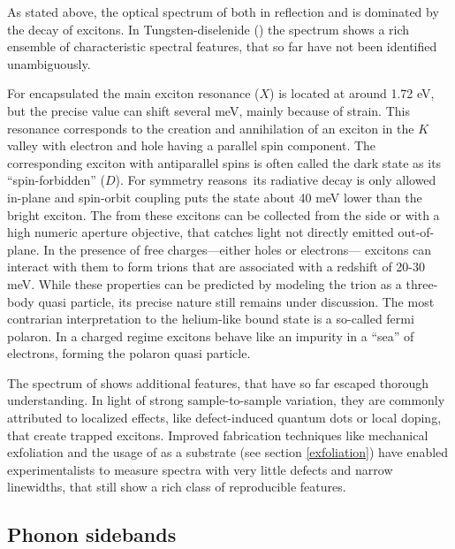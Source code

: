 As stated above, the optical spectrum of \tmds both in reflection and \pl is dominated by the decay of excitons. In Tungsten-diselenide (\wse\!) the \pl spectrum shows a rich ensemble of characteristic spectral features, that so far have not been identified unambiguously. 

For \hbng encapsulated \wse the main exciton resonance ($X$) is located at around 1.72 eV, but the precise value can shift several meV, mainly because of strain\cite{zhu_strain_2013}. This resonance corresponds to the creation and annihilation of an exciton in the $K$ valley with electron and hole having a parallel spin component. The corresponding exciton with antiparallel spins is often called the dark state as its ``spin-forbidden'' ($D$). For symmetry reasons\textregistered\ its radiative decay is only allowed in-plane and spin-orbit coupling puts the state about 40 meV lower than the bright exciton\cite{echeverry_splitting_2016}. The \pl from these excitons can be collected from the side or with a high numeric aperture objective, that catches light not directly emitted out-of-plane\cite{robert_fine_2017, wang_-plane_2017}. In the presence of free charges---either holes or electrons--- excitons can interact with them to form trions that are associated with a redshift of 20-30 meV\cite{courtade_charged_2017}. While these properties can be predicted by modeling the trion as a three-body quasi particle, its precise nature still remains under discussion. The most contrarian interpretation to the helium-like bound state is a so-called fermi polaron. In a charged regime excitons behave like an impurity in a ``sea'' of electrons, forming the polaron quasi particle\cite{sidler_fermi_2016, efimkin_many-body_2017,schmidt_fermi_2012}.

The spectrum of \wse shows additional features, that have so far escaped thorough understanding. In light of strong sample-to-sample variation, they are commonly attributed to localized effects, like defect-induced quantum dots or local doping\cite{kato_optical_2014, zhang_defect_2017}, that create trapped excitons. Improved fabrication techniques like mechanical exfoliation and the usage of \hbng as a substrate (see section \ref{exfoliation}) have enabled experimentalists to measure spectra with very little defects and narrow linewidths, that still show a rich class of reproducible features.

\subsection{Phonon sidebands}\label{sidebands}

